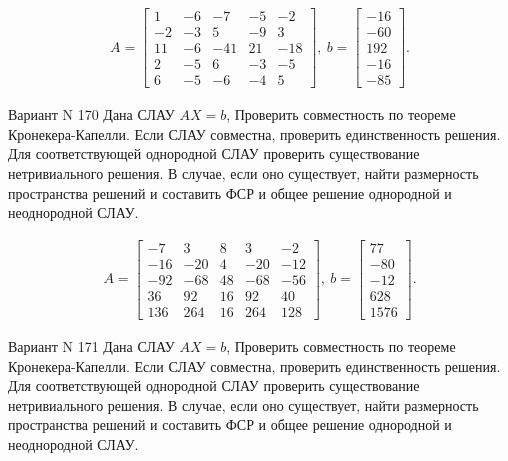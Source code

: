 \documentclass[11pt]{report}
\begin{document}
\begin{align*}
 A = \left[\begin{matrix}1 & -6 & -7 & -5 & -2\\-2 & -3 & 5 & -9 & 3\\11 & -6 & -41 & 21 & -18\\2 & -5 & 6 & -3 & -5\\6 & -5 & -6 & -4 & 5\end{matrix}\right],
\ b = \left[\begin{matrix}-16\\-60\\192\\-16\\-85\end{matrix}\right]. 
 \end{align*}

Вариант N 170
Дана СЛАУ $AX = b$,
Проверить совместность по теореме Кронекера-Капелли. Если СЛАУ совместна, проверить единственность решения.
Для соответствующей однородной СЛАУ проверить существование нетривиального решения. В случае, если оно существует,
найти размерность пространства решений и составить ФСР и общее решение однородной  и неоднородной СЛАУ.


\begin{align*}
 A = \left[\begin{matrix}-7 & 3 & 8 & 3 & -2\\-16 & -20 & 4 & -20 & -12\\-92 & -68 & 48 & -68 & -56\\36 & 92 & 16 & 92 & 40\\136 & 264 & 16 & 264 & 128\end{matrix}\right],
\ b = \left[\begin{matrix}77\\-80\\-12\\628\\1576\end{matrix}\right]. 
 \end{align*}

Вариант N 171
Дана СЛАУ $AX = b$,
Проверить совместность по теореме Кронекера-Капелли. Если СЛАУ совместна, проверить единственность решения.
Для соответствующей однородной СЛАУ проверить существование нетривиального решения. В случае, если оно существует,
найти размерность пространства решений и составить ФСР и общее решение однородной  и неоднородной СЛАУ.
\end{document}
